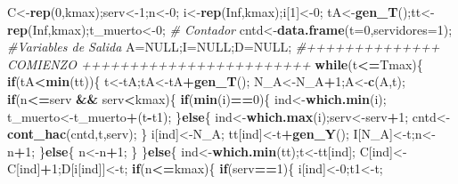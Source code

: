 \documentclass[]{article}
\newenvironment{Shaded}{\begin{snugshade}}{\end{snugshade}}
\newcommand{\KeywordTok}[1]{\textcolor[rgb]{0.13,0.29,0.53}{\textbf{#1}}}
\newcommand{\DataTypeTok}[1]{\textcolor[rgb]{0.13,0.29,0.53}{#1}}
\newcommand{\DecValTok}[1]{\textcolor[rgb]{0.00,0.00,0.81}{#1}}
\newcommand{\StringTok}[1]{\textcolor[rgb]{0.31,0.60,0.02}{#1}}
\newcommand{\CommentTok}[1]{\textcolor[rgb]{0.56,0.35,0.01}{\textit{#1}}}
\newcommand{\OtherTok}[1]{\textcolor[rgb]{0.56,0.35,0.01}{#1}}
\newcommand{\ControlFlowTok}[1]{\textcolor[rgb]{0.13,0.29,0.53}{\textbf{#1}}}
\newcommand{\OperatorTok}[1]{\textcolor[rgb]{0.81,0.36,0.00}{\textbf{#1}}}
\newcommand{\NormalTok}[1]{#1}
\begin{document}
\begin{Shaded}
\begin{Highlighting}[]
\NormalTok{  C<-}\KeywordTok{rep}\NormalTok{(}\DecValTok{0}\NormalTok{,kmax);serv<-}\DecValTok{1}\NormalTok{;n<-}\DecValTok{0}\NormalTok{;}
\NormalTok{  i<-}\KeywordTok{rep}\NormalTok{(}\OtherTok{Inf}\NormalTok{,kmax);i[}\DecValTok{1}\NormalTok{]<-}\DecValTok{0}\NormalTok{;}
\NormalTok{  tA<-}\KeywordTok{gen_T}\NormalTok{();tt<-}\KeywordTok{rep}\NormalTok{(}\OtherTok{Inf}\NormalTok{,kmax);t_muerto<-}\DecValTok{0}\NormalTok{;}
  \CommentTok{# Contador}
\NormalTok{  cntd<-}\KeywordTok{data.frame}\NormalTok{(}\DataTypeTok{t=}\DecValTok{0}\NormalTok{,}\DataTypeTok{servidores=}\DecValTok{1}\NormalTok{);}
  \CommentTok{#Variables de Salida}
\NormalTok{  A=}\OtherTok{NULL}\NormalTok{;I=}\OtherTok{NULL}\NormalTok{;D=}\OtherTok{NULL}\NormalTok{;}
  \CommentTok{#++++++++++++++    COMIENZO  ++++++++++++++++++++++++}
  \ControlFlowTok{while}\NormalTok{(t}\OperatorTok{<=}\NormalTok{Tmax)\{}
    \ControlFlowTok{if}\NormalTok{(tA}\OperatorTok{<}\KeywordTok{min}\NormalTok{(tt))\{}
\NormalTok{      t<-tA;tA<-tA}\OperatorTok{+}\KeywordTok{gen_T}\NormalTok{();}
\NormalTok{      N_A<-N_A}\OperatorTok{+}\DecValTok{1}\NormalTok{;A<-}\KeywordTok{c}\NormalTok{(A,t);}
      \ControlFlowTok{if}\NormalTok{(n}\OperatorTok{<=}\NormalTok{serv }\OperatorTok{&&}\StringTok{ }\NormalTok{serv}\OperatorTok{<}\NormalTok{kmax)\{ }
        \ControlFlowTok{if}\NormalTok{(}\KeywordTok{min}\NormalTok{(i)}\OperatorTok{==}\DecValTok{0}\NormalTok{)\{}
\NormalTok{          ind<-}\KeywordTok{which.min}\NormalTok{(i);}
\NormalTok{          t_muerto<-t_muerto}\OperatorTok{+}\NormalTok{(t}\OperatorTok{-}\NormalTok{t1);}
\NormalTok{        \}}\ControlFlowTok{else}\NormalTok{\{}
\NormalTok{          ind<-}\KeywordTok{which.max}\NormalTok{(i);serv<-serv}\OperatorTok{+}\DecValTok{1}\NormalTok{;}
\NormalTok{          cntd<-}\KeywordTok{cont_hac}\NormalTok{(cntd,t,serv);}
\NormalTok{        \}}
\NormalTok{        i[ind]<-N_A;}
\NormalTok{        tt[ind]<-t}\OperatorTok{+}\KeywordTok{gen_Y}\NormalTok{();}
\NormalTok{        I[N_A]<-t;n<-n}\OperatorTok{+}\DecValTok{1}\NormalTok{;}
\NormalTok{      \}}\ControlFlowTok{else}\NormalTok{\{}
\NormalTok{        n<-n}\OperatorTok{+}\DecValTok{1}\NormalTok{;}
\NormalTok{      \}}
\NormalTok{    \}}\ControlFlowTok{else}\NormalTok{\{}
\NormalTok{      ind<-}\KeywordTok{which.min}\NormalTok{(tt);t<-tt[ind];}
\NormalTok{      C[ind]<-C[ind]}\OperatorTok{+}\DecValTok{1}\NormalTok{;D[i[ind]]<-t;}
      \ControlFlowTok{if}\NormalTok{(n}\OperatorTok{<=}\NormalTok{kmax)\{}
        \ControlFlowTok{if}\NormalTok{(serv}\OperatorTok{==}\DecValTok{1}\NormalTok{)\{}
\NormalTok{          i[ind]<-}\DecValTok{0}\NormalTok{;t1<-t;}

\end{Highlighting}
\end{Shaded}
\end{document}
